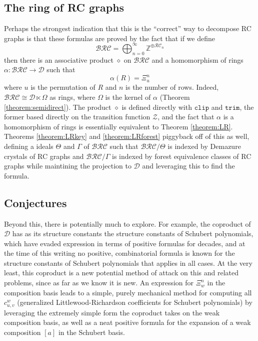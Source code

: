 \documentclass{amsart}
\theoremstyle{definition}
\theoremstyle{remark}
\numberwithin{equation}{subsection}
\newcommand{\trm}{\mathtt{trim}}
\newcommand{\zeromap}{\mathcal{Z}}
\newcommand{\clp}{\mathtt{clip}}
\newcommand{\BRC}{\mathcal{BRC}}
\newcommand{\RC}{\mathcal{RC}}
\newcommand{\dsch}{\ensuremath{\Xi}}
\newcommand{\dcoma}{\mathcal{D}}
\begin{document}
\subsection*{The ring of RC graphs}

Perhaps the strongest indication that this is the ``correct'' way to decompose RC graphs is that these formulas are proved by the fact that if we define
$$\BRC = \bigoplus_{n=0}^\infty \mathbb{Z}^{\oplus\RC_n}$$
then there is an associative product $\diamond$ on $\BRC$ and a homomorphism of rings $\alpha:\BRC\to \dcoma$ such that
$$\alpha(R) = \dsch_u^n$$
where $u$ is the permutation of $R$ and $n$ is the number of rows. Indeed, $\BRC\cong \dcoma\ltimes \Omega$ as rings, where $\Omega$ is the kernel of $\alpha$ (Theorem \ref{theorem:semidirect}). The product $\diamond$ is defined directly with $\clp$ and $\trm$, the former based directly on the transition function $\zeromap$, and the fact that $\alpha$ is a homomorphism of rings is essentially equivalent to Theorem \ref{theorem:LR}. Theorems \ref{theorem:LRkey} and \ref{theorem:LRforest} piggyback off of this as well, defining a ideals $\Theta$ and $\Gamma$ of $\BRC$ such that $\BRC/\Theta$ is indexed by Demazure crystals of RC graphs and $\BRC/\Gamma$ is indexed by forest equivalence classes of RC graphs while maintining the projection to $\dcoma$ and leveraging this to find the formula.

\subsection*{Conjectures}

Beyond this, there is potentially much to explore. For example, the coproduct of $\dcoma$ has as its structure constants the structure constants of Schubert polynomials, which have evaded expression in terms of positive formulas for decades, and at the time of this writing no positive, combinatorial formula is known for the structure constants of Schubert polynomials that applies in all cases. At the very least, this coproduct is a new potential method of attack on this and related problems, since as far as we know it is new. An expression for $\dsch_w^n$ in the composition basis leads to a simple, purely mechanical method for computing all $c_{u,v}^w$ (generalized Littlewood-Richardson coefficients for Schubert polynomials) by leveraging the extremely simple form the coproduct takes on the weak composition basis, as well as a neat positive formula for the expansion of a weak composition $[a]$ in the Schubert basis.
\end{document}
